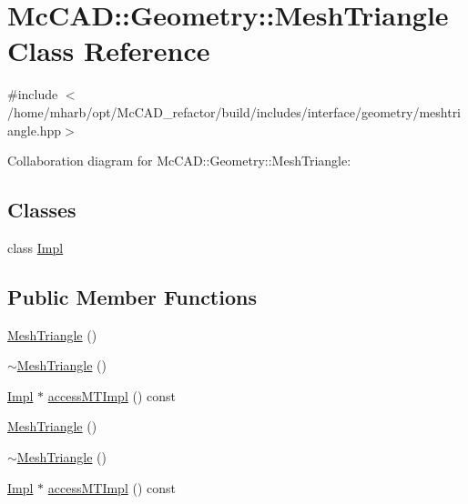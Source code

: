 \hypertarget{classMcCAD_1_1Geometry_1_1MeshTriangle}{}\section{Mc\+C\+AD\+:\+:Geometry\+:\+:Mesh\+Triangle Class Reference}
\label{classMcCAD_1_1Geometry_1_1MeshTriangle}


{\ttfamily \#include $<$/home/mharb/opt/\+Mc\+C\+A\+D\+\_\+refactor/build/includes/interface/geometry/meshtriangle.\+hpp$>$}



Collaboration diagram for Mc\+C\+AD\+:\+:Geometry\+:\+:Mesh\+Triangle\+:
\subsection*{Classes}
\begin{DoxyCompactItemize}
\item 
class \hyperlink{classMcCAD_1_1Geometry_1_1MeshTriangle_1_1Impl}{Impl}
\end{DoxyCompactItemize}
\subsection*{Public Member Functions}
\begin{DoxyCompactItemize}
\item 
\hyperlink{classMcCAD_1_1Geometry_1_1MeshTriangle_a7730c10f9d7058ad6347a0323aead15d}{Mesh\+Triangle} ()
\item 
\hyperlink{classMcCAD_1_1Geometry_1_1MeshTriangle_ae91f5ede4cafa8b41e3eeadb2365e4ed}{$\sim$\+Mesh\+Triangle} ()
\item 
\hyperlink{classMcCAD_1_1Geometry_1_1MeshTriangle_1_1Impl}{Impl} $\ast$ \hyperlink{classMcCAD_1_1Geometry_1_1MeshTriangle_abd8b4e7b4f1dc5da17651c741bc6fada}{access\+M\+T\+Impl} () const
\item 
\hyperlink{classMcCAD_1_1Geometry_1_1MeshTriangle_a7730c10f9d7058ad6347a0323aead15d}{Mesh\+Triangle} ()
\item 
\hyperlink{classMcCAD_1_1Geometry_1_1MeshTriangle_ae91f5ede4cafa8b41e3eeadb2365e4ed}{$\sim$\+Mesh\+Triangle} ()
\item 
\hyperlink{classMcCAD_1_1Geometry_1_1MeshTriangle_1_1Impl}{Impl} $\ast$ \hyperlink{classMcCAD_1_1Geometry_1_1MeshTriangle_abe51f006f2e495583a18f28570778c4a}{access\+M\+T\+Impl} () const
\end{DoxyCompactItemize}
